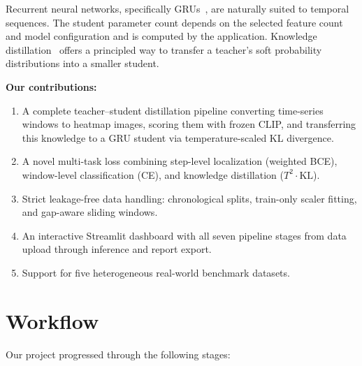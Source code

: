 \documentclass[10pt,twocolumn]{article}
\begin{document}
Recurrent neural networks, specifically GRUs~\cite{gru2014}, are naturally suited to temporal sequences. The student parameter count depends on the selected feature count and model configuration and is computed by the application. Knowledge distillation~\cite{hinton2015distilling} offers a principled way to transfer a teacher's soft probability distributions into a smaller student.

\textbf{Our contributions:}
\begin{enumerate}[leftmargin=*, topsep=2pt, itemsep=2pt]
    \item A complete teacher--student distillation pipeline converting time-series windows to heatmap images, scoring them with frozen CLIP, and transferring this knowledge to a GRU student via temperature-scaled KL divergence.
    \item A novel multi-task loss combining step-level localization (weighted BCE), window-level classification (CE), and knowledge distillation ($T^2 \cdot \text{KL}$).
    \item Strict leakage-free data handling: chronological splits, train-only scaler fitting, and gap-aware sliding windows.
    \item An interactive Streamlit dashboard with all seven pipeline stages from data upload through inference and report export.
    \item Support for five heterogeneous real-world benchmark datasets.
\end{enumerate}

\section{Workflow}

Our project progressed through the following stages:
\end{document}
